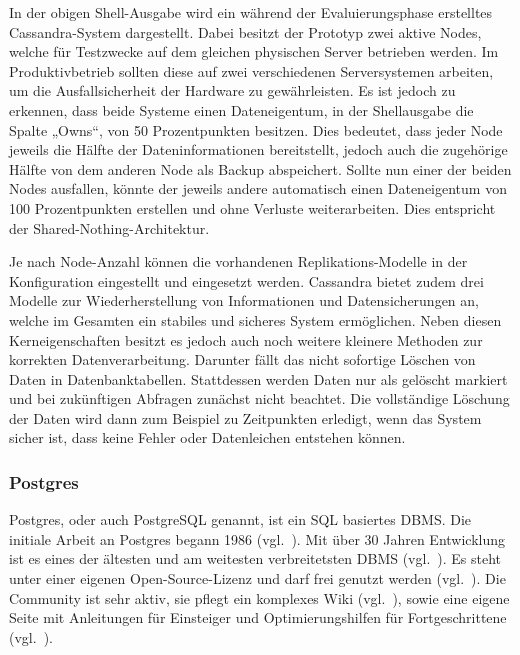 In der obigen Shell-Ausgabe wird ein während der Evaluierungsphase erstelltes
Cassandra-System dargestellt. Dabei besitzt der Prototyp zwei aktive Nodes,
welche für Testzwecke auf dem gleichen physischen Server betrieben werden. Im
Produktivbetrieb sollten diese auf zwei verschiedenen Serversystemen arbeiten,
um die Ausfallsicherheit der Hardware zu gewährleisten. Es ist jedoch zu
erkennen, dass beide Systeme einen Dateneigentum, in der Shellausgabe die
Spalte „Owns“, von 50 Prozentpunkten besitzen. Dies bedeutet, dass jeder Node
jeweils die Hälfte der Dateninformationen bereitstellt, jedoch auch die
zugehörige Hälfte von dem anderen Node als Backup abspeichert. Sollte nun einer
der beiden Nodes ausfallen, könnte der jeweils andere automatisch einen
Dateneigentum von 100 Prozentpunkten erstellen und ohne Verluste
weiterarbeiten. Dies entspricht der \gls{Shared-Nothing-Architektur}.

Je nach Node-Anzahl können die vorhandenen Replikations-Modelle in der
Konfiguration eingestellt und eingesetzt werden. Cassandra bietet zudem drei
Modelle zur Wiederherstellung von Informationen und Datensicherungen an, welche
im Gesamten ein stabiles und sicheres System ermöglichen. Neben diesen
Kerneigenschaften besitzt es jedoch auch noch weitere kleinere Methoden
zur korrekten Datenverarbeitung. Darunter fällt das nicht sofortige Löschen von
Daten in Datenbanktabellen. Stattdessen werden Daten nur als gelöscht markiert
und bei zukünftigen Abfragen zunächst nicht beachtet. Die vollständige Löschung
der Daten wird dann zum Beispiel zu Zeitpunkten erledigt, wenn das System
sicher ist, dass keine Fehler oder Datenleichen entstehen können.
\nl%

\subsubsection{Postgres}
\label{subsubsec:postgres}
Postgres, oder auch PostgreSQL genannt, ist ein \gls{SQL} basiertes \gls{DBMS}.
Die initiale Arbeit an Postgres begann 1986 (vgl.~\cite{old_postgres}). Mit
über 30 Jahren Entwicklung ist es eines der ältesten und am weitesten
verbreitetsten DBMS (vgl.~\cite{db_ranking}). Es steht unter einer eigenen
Open-Source-Lizenz und darf frei genutzt werden (vgl.~\cite{postgres_license}).
Die Community ist sehr aktiv, sie pflegt ein komplexes Wiki
(vgl.~\cite{postgres_wiki}), sowie eine eigene Seite mit Anleitungen für
Einsteiger und Optimierungshilfen für Fortgeschrittene
(vgl.~\cite{postgres_tutorial}).

\begin{center}
    \inputminted{text}{../listings/postgres-clone.txt}
\end{center}

